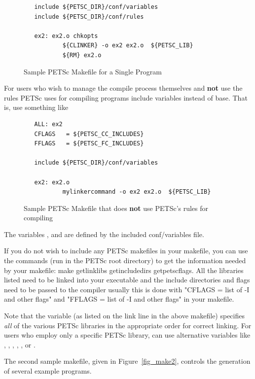 {{{\begin{figure}[H]
{\begin{verbatim}
   include ${PETSC_DIR}/conf/variables
   include ${PETSC_DIR}/conf/rules

   ex2: ex2.o chkopts
           ${CLINKER} -o ex2 ex2.o  ${PETSC_LIB}
           ${RM} ex2.o
\end{verbatim}
}
\caption{Sample PETSc Makefile for a Single Program}
\label{fig_make1}
\end{figure}

For users who wish to manage the compile process themselves
and {\bf not} use the rules PETSc uses for compiling programs
include variables instead of base. That is, use something like

\begin{figure}[H]
{\small
\begin{verbatim}
   ALL: ex2
   CFLAGS   = ${PETSC_CC_INCLUDES}
   FFLAGS   = ${PETSC_FC_INCLUDES}

   include ${PETSC_DIR}/conf/variables

   ex2: ex2.o
           mylinkercommand -o ex2 ex2.o  ${PETSC_LIB}
\end{verbatim}
}
\caption{Sample PETSc Makefile that does {\bf not} use PETSc's rules for compiling}
\label{fig_make1var}
\end{figure}
The variables , 
and  are defined by the included conf/variables file.

If you do not wish to include any PETSc makefiles in your makefile,
you can use the commands (run in the PETSc root directory) to get the information
needed by your makefile: make getlinklibs getincludedirs getpetscflags.
All the libraries listed need to be linked into your executable and the 
include directories and flags need to be passed to the compiler usually
this is done with "CFLAGS = list of -I and other flags" and
"FFLAGS = list of -I and other flags" in your makefile.



 
Note that the variable  (as listed on the link
line in the above makefile) specifies {\em all} of the various PETSc
libraries in the appropriate order for correct linking.  For users who
employ only a specific PETSc library, can use alternative variables
like  , , 
, ,
,  or
.

The second sample makefile, given in Figure~\ref{fig_make2},
controls the generation of several example programs. 

}}}
